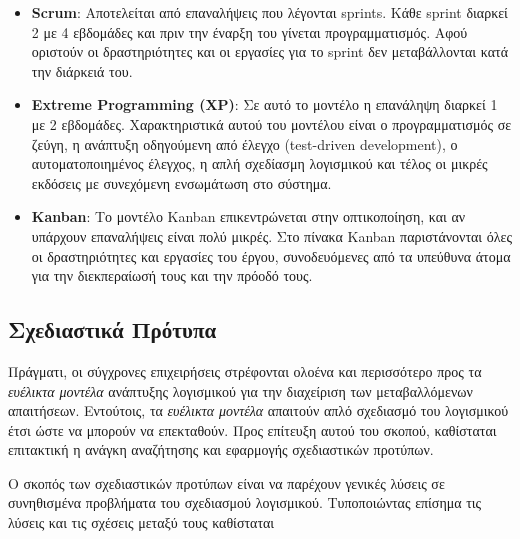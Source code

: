 \begin{itemize}
    \item \textbf{Scrum}: Αποτελείται από επαναλήψεις που λέγονται sprints. Κάθε sprint διαρκεί 2 με 4 εβδομάδες και πριν την έναρξη του γίνεται προγραμματισμός. Αφού οριστούν οι δραστηριότητες και οι εργασίες για το sprint δεν μεταβάλλονται κατά την διάρκειά του.
    \item \textbf{Extreme Programming (XP)}: Σε αυτό το μοντέλο η επανάληψη διαρκεί 1 με 2 εβδομάδες. Χαρακτηριστικά αυτού του μοντέλου είναι ο προγραμματισμός σε ζεύγη, η ανάπτυξη οδηγούμενη από έλεγχο (test-driven development), ο αυτοματοποιημένος έλεγχος, η απλή σχεδίασμη λογισμικού και τέλος οι μικρές εκδόσεις με συνεχόμενη ενσωμάτωση στο σύστημα.
    \item \textbf{Kanban}: Το μοντέλο Kanban επικεντρώνεται στην οπτικοποίηση, και αν υπάρχουν επαναλήψεις είναι πολύ μικρές. Στο πίνακα Kanban παριστάνονται όλες οι δραστηριότητες και εργασίες του έργου, συνοδευόμενες από τα υπεύθυνα άτομα για την διεκπεραίωσή τους και την πρόοδό τους.
\end{itemize}


\subsection{Σχεδιαστικά Πρότυπα}
Πράγματι, οι σύγχρονες επιχειρήσεις στρέφονται ολοένα και περισσότερο προς τα \textsl{ευέλικτα μοντέλα} ανάπτυξης λογισμικού για την διαχείριση των μεταβαλλόμενων απαιτήσεων. Εντούτοις, τα \textsl{ευέλικτα μοντέλα} απαιτούν απλό σχεδιασμό του λογισμικού έτσι ώστε να μπορούν να επεκταθούν. Προς επίτευξη αυτού του σκοπού, καθίσταται επιτακτική η ανάγκη αναζήτησης και εφαρμογής σχεδιαστικών προτύπων.

Ο σκοπός των σχεδιαστικών προτύπων είναι να παρέχουν γενικές λύσεις σε συνηθισμένα προβλήματα του σχεδιασμού λογισμικού. Τυποποιώντας επίσημα τις λύσεις και τις σχέσεις μεταξύ τους καθίσταται